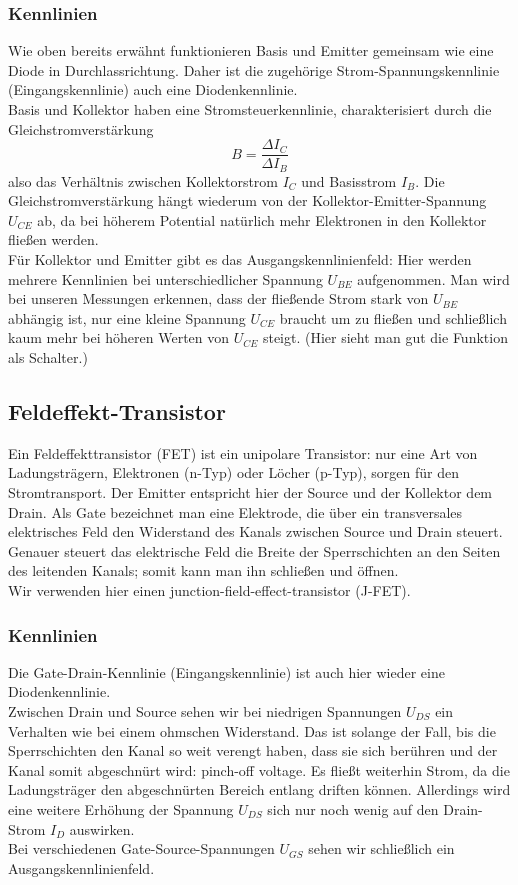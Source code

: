 \documentclass[12pt,a4paper,twopage]{article}
\begin{document}
\subsubsection{Kennlinien}
Wie oben bereits erwähnt funktionieren Basis und Emitter gemeinsam wie eine Diode in Durchlassrichtung. Daher ist die zugehörige Strom-Spannungskennlinie (Eingangskennlinie) auch eine Diodenkennlinie.\\
Basis und Kollektor haben eine Stromsteuerkennlinie, charakterisiert durch die Gleichstromverstärkung
$$B=\frac{\Delta I_C}{\Delta I_B}$$
also das Verhältnis zwischen Kollektorstrom $I_C$ und Basisstrom $I_B$. Die Gleichstromverstärkung hängt wiederum von der Kollektor-Emitter-Spannung $U_{CE}$ ab, da bei höherem Potential natürlich mehr Elektronen in den Kollektor fließen werden.\\
Für Kollektor und Emitter gibt es das Ausgangskennlinienfeld: Hier werden mehrere Kennlinien bei unterschiedlicher Spannung $U_{BE}$ aufgenommen. Man wird bei unseren Messungen erkennen, dass der fließende Strom stark von $U_{BE}$ abhängig ist, nur eine kleine Spannung $U_{CE}$ braucht um zu fließen und schließlich kaum mehr bei höheren Werten von $U_{CE}$ steigt. (Hier sieht man gut die Funktion als Schalter.)

\subsection{Feldeffekt-Transistor}
Ein Feldeffekttransistor (FET) ist ein unipolare Transistor: nur eine Art von Ladungsträgern, Elektronen (n-Typ) oder Löcher (p-Typ), sorgen für den Stromtransport. Der Emitter entspricht hier der Source und der Kollektor dem Drain. Als Gate bezeichnet man eine Elektrode, die über ein transversales elektrisches Feld den Widerstand des Kanals zwischen Source und Drain steuert. Genauer steuert das elektrische Feld die Breite der Sperrschichten an den Seiten des leitenden Kanals; somit kann man ihn schließen und öffnen.\\
Wir verwenden hier einen junction-field-effect-transistor (J-FET).

\subsubsection{Kennlinien}
Die Gate-Drain-Kennlinie (Eingangskennlinie) ist auch hier wieder eine Diodenkennlinie.\\
Zwischen Drain und Source sehen wir bei niedrigen Spannungen $U_{DS}$ ein Verhalten wie bei einem ohmschen Widerstand. Das ist solange der Fall, bis die Sperrschichten den Kanal so weit verengt haben, dass sie sich berühren und der Kanal somit abgeschnürt wird: pinch-off voltage. Es fließt weiterhin Strom, da die Ladungsträger den abgeschnürten Bereich entlang driften können. Allerdings wird eine weitere Erhöhung der Spannung $U_{DS}$ sich nur noch wenig auf den Drain-Strom $I_D$ auswirken.\\
Bei verschiedenen Gate-Source-Spannungen $U_{GS}$ sehen wir schließlich ein Ausgangskennlinienfeld.
\end{document}
